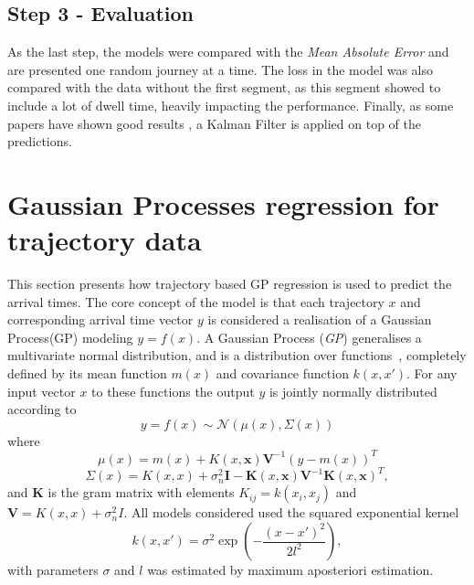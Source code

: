\subsection{Step 3 - Evaluation}
As the last step, the models were compared with the \textit{Mean Absolute Error} and are presented one random journey at a time. The loss in the model was also compared with the data without the first segment, as this segment showed to include a lot of dwell time, heavily impacting the performance. Finally, as some papers have shown good results \cite{kalmanPrediction, brazilANN}, a Kalman Filter is applied on top of the predictions.

\section{Gaussian Processes regression for trajectory data}
This section presents how trajectory based GP regression is used to
predict the arrival times. The core concept of the model is that each
trajectory $x$ and corresponding arrival time vector $y$ is
considered a realisation of a Gaussian Process(GP) modeling $y =
f(x)$.  A Gaussian Process (\textit{GP}) generalises a multivariate
normal distribution, and is a distribution over
functions~\cite{Rasmussen-Williams-2006},  completely defined by its
mean function $m(x)$ and covariance function $k(x, x')$. For any input
vector $x$ to these functions the output $y$ is jointly normally distributed according to
\begin{equation}
  \label{eq:gp}
  y = f(x) \sim \mathcal{N}(\mu(x), \Sigma(x))
\end{equation}
where
\begin{equation}
  \label{eq:gp-mean-function}
  \mu(x) = m(x) + K(x, \textbf{x})\textbf{V}^{-1}{(y-m(x))}^{T}
\end{equation}
\begin{equation}
  \label{eq:gp-covariance-function}
  \Sigma(x) = K(x, x) + \sigma^{2}_n\textbf{I} - \textbf{K}(x, \textbf{x})\textbf{V}^{-1}{\textbf{K}(x, \textbf{x})}^{T},
\end{equation}
and $\textbf{K}$ is the gram matrix with elements $K_{ij} = k(x_i, x_j)$ and $\textbf{V}
= K(x, x) + \sigma_n^2I$. All models considered used the squared
exponential kernel
\begin{equation}
  k(x, x') = \sigma^2\exp(-\frac{(x-x')^{2}}{2l^2}),
\end{equation}
with parameters $\sigma$ and $l$ was estimated by maximum aposteriori estimation. 

